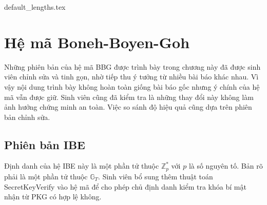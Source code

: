 \documentclass[class=report, crop=false]{standalone}
\begin{document}
	{default_lengths.tex}
	\baselineskip
	\chapter{Hệ mã Boneh-Boyen-Goh}\label{chap:5}
	Những phiên bản của hệ mã BBG được trình bày trong chương này đã được sinh viên chỉnh sửa và tinh gọn, nhờ tiếp thu ý tưởng từ nhiều bài báo khác nhau. Vì vậy nội dung trình bày không hoàn toàn giống bài báo gốc nhưng ý chính của hệ mã vẫn được giữ. Sinh viên cũng đã kiểm tra là những thay đổi này không làm ảnh hưởng chứng minh an toàn. Việc so sánh độ hiệu quả cũng dựa trên phiên bản chỉnh sửa.
	\section{Phiên bản IBE}
		Định danh của hệ IBE này là một phần tử thuộc $\mathbb{Z}_p^*$ với $p$ là số nguyên tố. Bản rõ phải là một phần tử thuộc $\mathbb{G}_T$. Sinh viên bổ sung thêm thuật toán \textsf{SecretKeyVerify} vào hệ mã để cho phép chủ định danh kiểm tra khóa bí mật nhận từ PKG có hợp lệ không.
		\vspace{-1.5\baselineskip}
\end{document}

